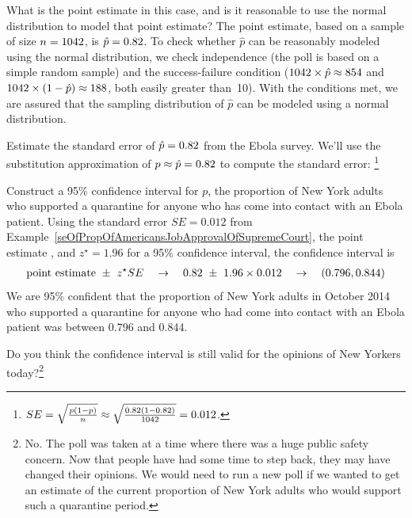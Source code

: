 \begin{example}{What is the point estimate in this case,
    and is it reasonable to
    use the normal distribution to model that point estimate?}
  The point estimate, based on a sample of size $n = 1042{}$,
  is $\hat{p} = 0.82{}$. To check whether $\hat{p}$ can be reasonably
  modeled using the normal distribution, we check independence
  (the poll is based on a simple random sample) and the
  success-failure condition
  ($1042{} \times \hat{p} \approx 854{}$
  and $1042{} \times (1 - \hat{p})
      \approx 188{}$,
  both easily greater than~10). With the conditions met, we are assured
  that the sampling distribution of $\hat{p}$ can be modeled using
  a normal distribution.
\end{example}

\begin{example}{Estimate the standard error of
    $\hat{p} = 0.82{}$ from the Ebola survey.}
  We'll use the substitution approximation of
  $p \approx \hat{p} = 0.82{}$ to compute the standard error:
  \footnote{$SE = \sqrt{\frac{p(1-p)}{n}}
    \approx \sqrt{\frac{0.82{}
        (1 - 0.82{})}{1042{}}}
    = 0.012{}$.}
\end{example}

\begin{example}{Construct a 95\% confidence interval for $p$,
    the proportion of New York adults who supported a quarantine
    for anyone who has come into contact with an Ebola patient.}
  Using the standard error $SE = 0.012$ from
  Example~\ref{seOfPropOfAmericansJobApprovalOfSupremeCourt},
  the point estimate \wsjebolapollprop{}, and $z^{\star} = 1.96$
  for a 95\% confidence interval, the confidence interval is
  \begin{eqnarray*}
  \text{point estimate} \ \pm\ z^{\star}SE
    \quad\to\quad 0.82{} \ \pm\ 1.96\times 0.012{}
    \quad\to\quad (0.796, 0.844)
  \end{eqnarray*}
  We are 95\% confident that the proportion of New York adults
  in October 2014 who supported a quarantine for anyone who had come
  into contact with an Ebola patient was between 0.796 and 0.844.
\end{example}

\begin{exercise}
Do you think the confidence interval is still valid for the opinions
of New Yorkers today?\footnote{No. The poll was taken at a
time where there was a huge public safety concern. Now that people
have had some time to step back, they may have changed their opinions.
We would need to run a new poll if we wanted to get an estimate of the
current proportion of New York adults who would support such a
quarantine period.}
\end{exercise}

